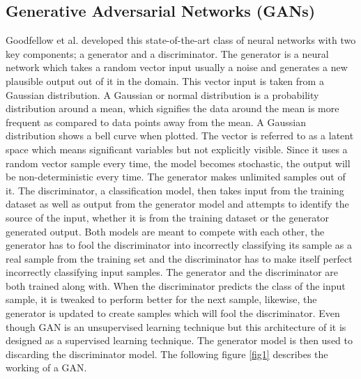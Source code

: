 \documentclass[conference]{IEEEtran}
\begin{document}
\subsection{Generative Adversarial Networks (GANs)}
Goodfellow et al. developed this state-of-the-art class of neural networks with two key components; a generator and a discriminator. The generator is a neural network which takes a random vector input usually a noise and generates a new plausible output out of it in the domain. This vector input is taken from a Gaussian distribution. A Gaussian or normal distribution is a probability distribution around a mean, which signifies the data around the mean is more frequent as compared to data points away from the mean. A Gaussian distribution shows a bell curve when plotted. The vector is referred to as a latent space which means significant variables but not explicitly visible. Since it uses a random vector sample every time, the model becomes stochastic, the output will be non-deterministic every time. The generator makes unlimited samples out of it. The discriminator, a classification model, then takes input from the training dataset as well as output from the generator model and attempts to identify the source of the input, whether it is from the training dataset or the generator generated output. Both models are meant to compete with each other, the generator has to fool the discriminator into incorrectly classifying its sample as a real sample from the training set and the discriminator has to make itself perfect incorrectly classifying input samples. The generator and the discriminator are both trained along with. When the discriminator predicts the class of the input sample, it is tweaked to perform better for the next sample, likewise, the generator is updated to create samples which will fool the discriminator. Even though GAN is an unsupervised learning technique but this architecture of it is designed as a supervised learning technique. The generator model is then used to discarding the discriminator model. The following figure \ref{fig1} describes the working of a GAN.
\end{document}
